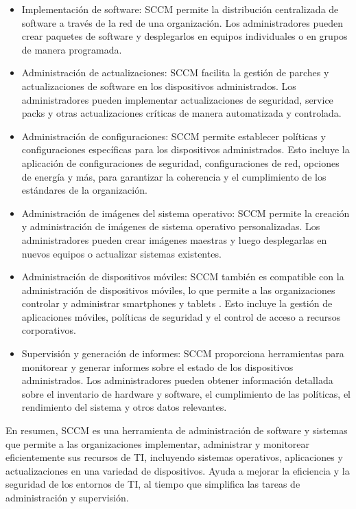 \documentclass[a4paper, 12pt]{book}
\begin{document}
\begin{itemize}

\item Implementación de software: SCCM permite la distribución centralizada de software a través de la red de una organización. Los administradores pueden crear paquetes de software y desplegarlos en equipos individuales o en grupos de manera programada.

\item Administración de actualizaciones: SCCM facilita la gestión de parches y actualizaciones de software en los dispositivos administrados. Los administradores pueden implementar actualizaciones de seguridad, service packs y otras actualizaciones críticas de manera automatizada y controlada.

\item Administración de configuraciones: SCCM permite establecer políticas y configuraciones específicas para los dispositivos administrados. Esto incluye la aplicación de configuraciones de seguridad, configuraciones de red, opciones de energía y más, para garantizar la coherencia y el cumplimiento de los estándares de la organización.

\item Administración de imágenes del sistema operativo: SCCM permite la creación y administración de imágenes de sistema operativo personalizadas. Los administradores pueden crear imágenes maestras y luego desplegarlas en nuevos equipos o actualizar sistemas existentes.

\item Administración de dispositivos móviles: SCCM también es compatible con la administración de dispositivos móviles, lo que permite a las organizaciones controlar y administrar smartphones y tablets	. Esto incluye la gestión de aplicaciones móviles, políticas de seguridad y el control de acceso a recursos corporativos.

\item Supervisión y generación de informes: SCCM proporciona herramientas para monitorear y generar informes sobre el estado de los dispositivos administrados. Los administradores pueden obtener información detallada sobre el inventario de hardware y software, el cumplimiento de las políticas, el rendimiento del sistema y otros datos relevantes.
\end{itemize}

En resumen, SCCM es una herramienta de administración de software y sistemas que permite a las organizaciones implementar, administrar y monitorear eficientemente sus recursos de TI, incluyendo sistemas operativos, aplicaciones y actualizaciones en una variedad de dispositivos. Ayuda a mejorar la eficiencia y la seguridad de los entornos de TI, al tiempo que simplifica las tareas de administración y supervisión.
\end{document}
